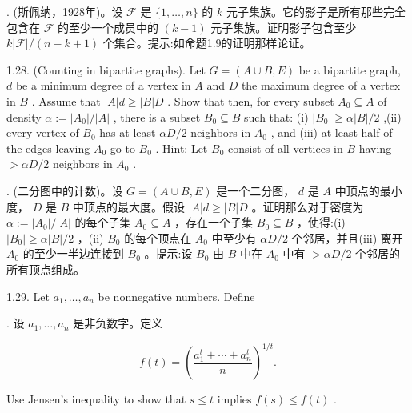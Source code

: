 \documentclass[10pt]{article}
\begin{document}
\begin{tcolorbox}. (斯佩纳，1928年)。设 \(\mathcal{F}\) 是 \(\{ 1,\ldots ,n\}\) 的 \(k\) 元子集族。它的影子是所有那些完全包含在 \(\mathcal{F}\) 的至少一个成员中的 \(\left( {k - 1}\right)\) 元子集族。证明影子包含至少 \(k\left| \mathcal{F}\right| /\left( {n - k + 1}\right)\) 个集合。提示:如命题1.9的证明那样论证。
\end{tcolorbox}

1.28. (Counting in bipartite graphs). Let \(G = \left( {A \cup  B,E}\right)\) be a bipartite graph, \(d\) be a minimum degree of a vertex in \(A\) and \(D\) the maximum degree of a vertex in \(B\) . Assume that \(\left| A\right| d \geq  \left| B\right| D\) . Show that then, for every subset \({A}_{0} \subseteq  A\) of density \(\alpha  \mathrel{\text{ := }} \left| {A}_{0}\right| /\left| A\right|\) , there is a subset \({B}_{0} \subseteq  B\) such that: (i) \(\left| {B}_{0}\right|  \geq  \alpha \left| B\right| /2\) ,(ii) every vertex of \({B}_{0}\) has at least \({\alpha D}/2\) neighbors in \({A}_{0}\) , and (iii) at least half of the edges leaving \({A}_{0}\) go to \({B}_{0}\) . Hint: Let \({B}_{0}\) consist of all vertices in \(B\) having \(> {\alpha D}/2\) neighbors in \({A}_{0}\) .

\begin{tcolorbox}. (二分图中的计数)。设 \(G = \left( {A \cup  B,E}\right)\) 是一个二分图， \(d\) 是 \(A\) 中顶点的最小度， \(D\) 是 \(B\) 中顶点的最大度。假设 \(\left| A\right| d \geq  \left| B\right| D\) 。证明那么对于密度为 \(\alpha  \mathrel{\text{ := }} \left| {A}_{0}\right| /\left| A\right|\) 的每个子集 \({A}_{0} \subseteq  A\) ，存在一个子集 \({B}_{0} \subseteq  B\) ，使得:(i) \(\left| {B}_{0}\right|  \geq  \alpha \left| B\right| /2\) ，(ii) \({B}_{0}\) 的每个顶点在 \({A}_{0}\) 中至少有 \({\alpha D}/2\) 个邻居，并且(iii) 离开 \({A}_{0}\) 的至少一半边连接到 \({B}_{0}\) 。提示:设 \({B}_{0}\) 由 \(B\) 中在 \({A}_{0}\) 中有 \(> {\alpha D}/2\) 个邻居的所有顶点组成。
\end{tcolorbox}

1.29. Let \({a}_{1},\ldots ,{a}_{n}\) be nonnegative numbers. Define

\begin{tcolorbox}. 设 \({a}_{1},\ldots ,{a}_{n}\) 是非负数字。定义
\end{tcolorbox}

\[
f\left( t\right)  = {\left( \frac{{a}_{1}^{t} + \cdots  + {a}_{n}^{t}}{n}\right) }^{1/t}.
\]

Use Jensen’s inequality to show that \(s \leq  t\) implies \(f\left( s\right)  \leq  f\left( t\right)\) .
\end{document}
